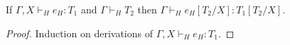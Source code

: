\begin{htes}
\label{htes}
If $\Gamma,X\vdash_{H}e_{H}:T_{1}$ and $\Gamma\vdash_{H}T_{2}$ then $\Gamma\vdash_{H}e_{H}[T_{2}/X]:T_{1}[T_{2}/X]$.
\begin{proof}
Induction on derivations of $\Gamma,X\vdash_{H}e_{H}:T_{1}$.
\end{proof}
\end{htes}